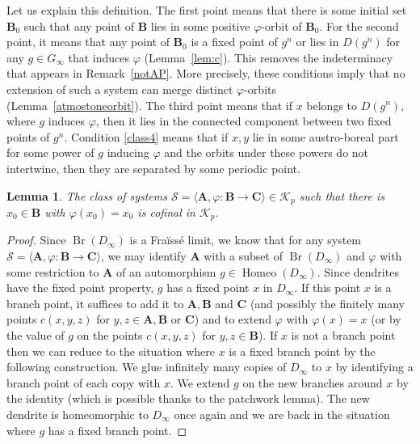 \documentclass[JEP,XML,SOM,Unicode,NoFloatCountersInSection]{cedram}
\let\mathcal\mathscr
\theoremstyle{plain}
\newtheorem{lem}[thm]{Lemma}
\theoremstyle{definition}
\newcommand{\bA}{{\boldsymbol{A}}}
\newcommand{\bB}{{\boldsymbol{B}}}
\newcommand{\bC}{{\boldsymbol{C}}}
\newcommand{\cK}{\mathcal{K}}
\newcommand{\cS}{\mathcal{S}}
\DeclareMathOperator{\Homeo}{Homeo}
\DeclareMathOperator{\Br}{Br}
\begin{document}
Let us explain this definition. The first point means that there is some initial set $\bB_0$ such that any point of $\bB$ lies in some positive $\varphi$-orbit of $\bB_0$. For the second point, it means that any point of $\bB_0$ is a fixed point of $g^n$ or lies in $D(g^n)$ for any $g\in G_\infty$ that induces $\varphi$ (Lemma~\ref{lem:c}). This removes the indeterminacy that appears in Remark~\ref{notAP}. More precisely, these conditions imply that no extension of such a system can merge distinct $\varphi$-orbits (Lemma~\ref{atmostoneorbit}). The third point means that if $x$ belongs to $D(g^n)$, where $g$ induces $\varphi$, then it lies in the connected component between two fixed points of $g^n$. Condition \eqref{class4} means that if $x,y$ lie in some austro-boreal part for some power of $g$ inducing $\varphi$ and the orbits under these powers do not intertwine, then they are separated by some periodic point.

\begin{lem}\label{fixpt} The class of systems $\cS=\langle \bA,\varphi\colon\bB\to\bC\rangle\in\cK_p$ such that there is $x_0\in \bB$ with $\varphi(x_0)=x_0$ is cofinal in $\cK_p$.
\end{lem}
\begin{proof}Since $\Br(D_\infty)$ is a Fraïssé limit, we know that for any system $\cS=\langle \bA,\varphi\colon\bB\to\bC\rangle$, we may identify $\bA$ with a subset of $\Br(D_\infty)$ and $\varphi$ with some restriction to $\bA$ of an automorphism $g\in\Homeo(D_\infty)$. Since dendrites have the fixed point property, $g$ has a fixed point $x$ in $D_\infty$. If this point $x$ is a branch point, it suffices to add it to $\bA,\bB$ and $\bC$ (and possibly the finitely many points $c(x,y,z)$ for $y,z\in \bA,\bB$ or $\bC$) and to extend $\varphi$ with $\varphi(x)=x$ (or by the value of $g$ on the points $c(x,y,z)$ for $y,z\in\bB$). If $x$ is not a branch point then we can reduce to the situation where $x$ is a fixed branch point by the following construction. We glue infinitely many copies of $D_\infty$ to $x$ by identifying a branch point of each copy with $x$. We extend $g$ on the new branches around $x$ by the identity (which is possible thanks to the patchwork lemma). The new dendrite is homeomorphic to $D_\infty$ once again and we are back in the situation where $g$ has a fixed branch point.
\end{proof}
\end{document}
